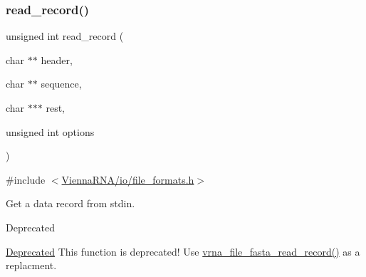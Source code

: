 \subsubsection{\texorpdfstring{read\_record()}{read\_record()}}
{\footnotesize\ttfamily unsigned int read\+\_\+record (\begin{DoxyParamCaption}\item[{char $\ast$$\ast$}]{header,  }\item[{char $\ast$$\ast$}]{sequence,  }\item[{char $\ast$$\ast$$\ast$}]{rest,  }\item[{unsigned int}]{options }\end{DoxyParamCaption})}



{\ttfamily \#include $<$\mbox{\hyperlink{io_2file__formats_8h}{Vienna\+R\+N\+A/io/file\+\_\+formats.\+h}}$>$}



Get a data record from stdin. 

\begin{DoxyRefDesc}{Deprecated}
\item[\mbox{\hyperlink{deprecated__deprecated000164}{Deprecated}}]This function is deprecated! Use \mbox{\hyperlink{group__file__formats_ga8cfb7e271efc9e1f34640acb85475639}{vrna\+\_\+file\+\_\+fasta\+\_\+read\+\_\+record()}} as a replacment.\end{DoxyRefDesc}
